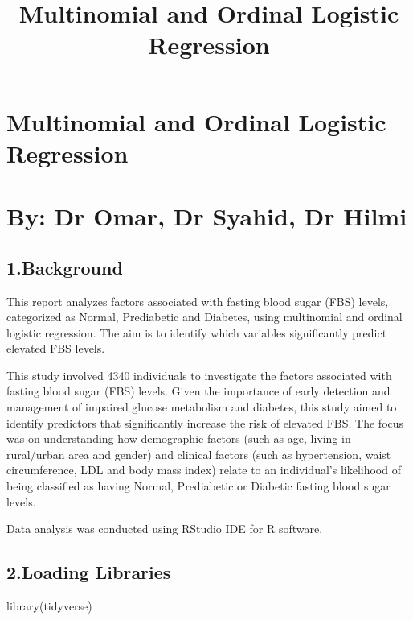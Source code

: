 \documentclass[
  letterpaper,
  DIV=11,
  numbers=noendperiod]{scrartcl}
\title{Multinomial and Ordinal Logistic Regression}
\author{}
\date{}
\newenvironment{Shaded}{\begin{snugshade}}{\end{snugshade}}
\newcommand{\FunctionTok}[1]{\textcolor[rgb]{0.28,0.35,0.67}{#1}}
\newcommand{\NormalTok}[1]{\textcolor[rgb]{0.00,0.23,0.31}{#1}}
\renewcommand*\contentsname{Table of contents}
\newcommand\contentsname{Table of contents}
\begin{document}
\maketitle

\renewcommand*\contentsname{Table of contents}
{
\hypersetup{linkcolor=}
\setcounter{tocdepth}{3}
\tableofcontents
}

\section{Multinomial and Ordinal Logistic
Regression}\label{multinomial-and-ordinal-logistic-regression}

\section{By: Dr Omar, Dr Syahid, Dr
Hilmi}\label{by-dr-omar-dr-syahid-dr-hilmi}

\subsection{1.Background}\label{background}

This report analyzes factors associated with fasting blood sugar (FBS)
levels, categorized as Normal, Prediabetic and Diabetes, using
multinomial and ordinal logistic regression. The aim is to identify
which variables significantly predict elevated FBS levels.

This study involved 4340 individuals to investigate the factors
associated with fasting blood sugar (FBS) levels. Given the importance
of early detection and management of impaired glucose metabolism and
diabetes, this study aimed to identify predictors that significantly
increase the risk of elevated FBS. The focus was on understanding how
demographic factors (such as age, living in rural/urban area and gender)
and clinical factors (such as hypertension, waist circumference, LDL and
body mass index) relate to an individual's likelihood of being
classified as having Normal, Prediabetic or Diabetic fasting blood sugar
levels.

Data analysis was conducted using RStudio IDE for R software.

\subsection{2.Loading Libraries}\label{loading-libraries}

\begin{Shaded}
\begin{Highlighting}[]
\FunctionTok{library}\NormalTok{(tidyverse)}
\end{Highlighting}
\end{Shaded}
\end{document}
